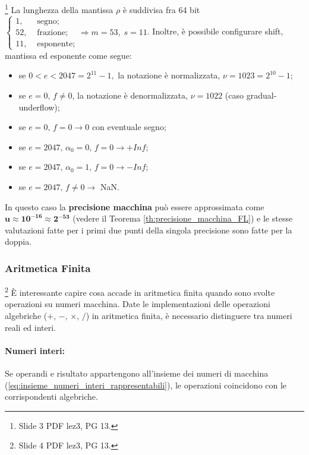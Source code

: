 \begin{definition}\footnote{Slide 3 PDF lez3, PG 13.}
	La lunghezza della mantissa $\rho$ è suddivisa fra 64 bit $\begin{cases}
		1, &\text{ segno};\\
		52, &\text{ frazione};\\
		11, &\text{ esponente};
	\end{cases}\Rightarrow m=53,\; s=11$.
	Inoltre, è possibile configurare shift, mantissa ed esponente come segue:
	\begin{itemize}
		\item se $0<e<2047=2^{11}-1,$ la notazione è normalizzata, $\nu=1023=2^{10}-1$;
		\item se $e=0,\,f\neq 0$, la notazione è denormalizzata, $\nu=1022$ (caso gradual-underflow);
		\item se $e=0,\,f=0\rightarrow 0$ con eventuale segno;
		\item se $e=2047,\,\alpha_0=0,\,f=0\rightarrow +Inf$;
		\item se $e=2047,\,\alpha_0=1,\,f=0\rightarrow -Inf$;
		\item se $e=2047,\,f\neq 0 \rightarrow$ NaN.
	\end{itemize}
\end{definition}

\begin{remark}
	In questo caso la \textbf{precisione macchina} può essere approssimata come $\boldsymbol{u\approx 10^{-16}\approx 2^{-53}}$ (vedere il Teorema \ref{th:precisione_macchina_FL}) e le stesse valutazioni fatte per i primi due punti della singola precisione sono fatte per la doppia.
\end{remark}

\subsubsection{Aritmetica Finita}\footnote{Slide 4 PDF lez3, PG 13.}
È interessante capire cosa accade in aritmetica finita quando sono svolte operazioni su numeri macchina. Date le implementazioni delle operazioni algebriche ($+,\, -,\,\times,\, \slash$) in aritmetica finita, è necessario distinguere tra numeri reali ed interi.

\paragraph{Numeri interi:} Se operandi e risultato appartengono all'insieme dei numeri di macchina (\ref{eq:insieme_numeri_interi_rappresentabili}), le operazioni coincidono con le corrispondenti algebriche.

